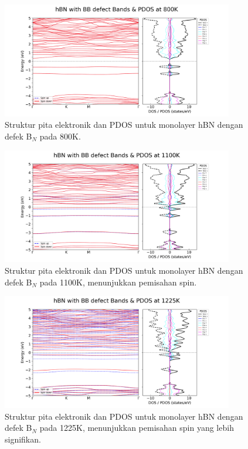 \begin{figure}[h!]
    \centering
    \includegraphics[width=0.9\textwidth]{gambar_hasil/simple_bands_pdos_BB_800K.png}
    \caption{Struktur pita elektronik dan PDOS untuk monolayer hBN dengan defek B$_N$ pada 800K.}
    \label{fig:hbn_BB_800K}
\end{figure}
\begin{figure}[h!]
    \centering
    \includegraphics[width=0.9\textwidth]{gambar_hasil/simple_bands_pdos_BB_1100K.png}
    \caption{Struktur pita elektronik dan PDOS untuk monolayer hBN dengan defek B$_N$ pada 1100K, menunjukkan pemisahan spin.}
    \label{fig:hbn_BB_1100K}
\end{figure}
\begin{figure}[h!]
    \centering
    \includegraphics[width=0.9\textwidth]{gambar_hasil/simple_bands_pdos_BB_1225K.png}
    \caption{Struktur pita elektronik dan PDOS untuk monolayer hBN dengan defek B$_N$ pada 1225K, menunjukkan pemisahan spin yang lebih signifikan.}
    \label{fig:hbn_BB_1225K}
\end{figure}
